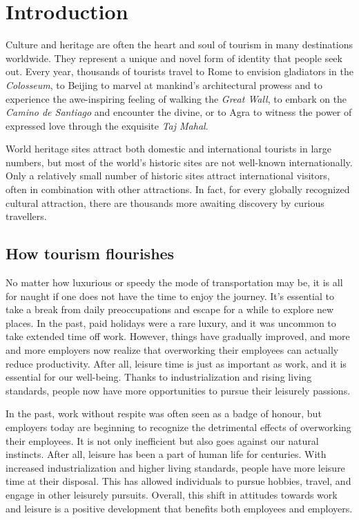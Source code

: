 \chapter{Introduction} %
\label{cha:intro}

Culture and heritage are often the heart and soul of tourism in many destinations worldwide. They represent a unique and novel form of identity that people seek out. Every year, thousands of tourists travel to Rome to envision gladiators in the \emph{Colosseum}, to Beijing to marvel at mankind's architectural prowess and to experience the awe-inspiring feeling of walking the \emph{Great Wall}, to embark on the \emph{Camino de Santiago} and encounter the divine, or to Agra to witness the power of expressed love through the exquisite \emph{Taj Mahal}.

World heritage sites attract both domestic and international tourists in large numbers, but most of the world's historic sites are not well-known internationally. Only a relatively small number of historic sites attract international visitors, often in combination with other attractions. In fact, for every globally recognized cultural attraction, there are thousands more awaiting discovery by curious travellers.

\section{How tourism flourishes} %
\label{sec:htf}

No matter how luxurious or speedy the mode of transportation may be, it is all for naught if one does not have the time to enjoy the journey. It's essential to take a break from daily preoccupations and escape for a while to explore new places. In the past, paid holidays were a rare luxury, and it was uncommon to take extended time off work. However, things have gradually improved, and more and more employers now realize that overworking their employees can actually reduce productivity. After all, leisure time is just as important as work, and it is essential for our well-being. Thanks to industrialization and rising living standards, people now have more opportunities to pursue their leisurely passions.

In the past, work without respite was often seen as a badge of honour, but employers today are beginning to recognize the detrimental effects of overworking their employees. It is not only inefficient but also goes against our natural instincts. After all, leisure has been a part of human life for centuries. With increased industrialization and higher living standards, people have more leisure time at their disposal. This has allowed individuals to pursue hobbies, travel, and engage in other leisurely pursuits. Overall, this shift in attitudes towards work and leisure is a positive development that benefits both employees and employers.

